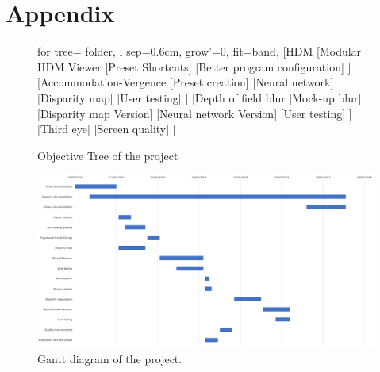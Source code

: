 \documentclass[10pt,a4paper,twocolumn,twoside]{article}
\begin{document}
	\section*{Appendix}
	\begin{figure}
		\begin{forest}
			for tree={%
				folder,
				l sep=0.6cm,
				grow'=0,
				fit=band,
			}
			[HDM
			[Modular HDM Viewer
			[Preset Shortcuts]
			[Better program configuration]
			]
			[Accommodation-Vergence
			[Preset creation]
			[Neural network]
			[Disparity map]
			[User testing]
			]
			[Depth of field blur
			[Mock-up blur]
			[Disparity map Version]
			[Neural network Version]
			[User testing]
			]
			[Third eye]
			[Screen quality]
			]
		\end{forest}
		\caption{Objective Tree of the project}
		\label{fig:objective}
	\end{figure}
	
	\begin{landscape}
		\begin{figure}
			\centering
			\includegraphics[width=1\linewidth]{img/gantt}
			\caption{Gantt diagram of the project.}
			\label{fig:gantt}
		\end{figure}
		
	\end{landscape}
	
	
	
	
\end{document}
